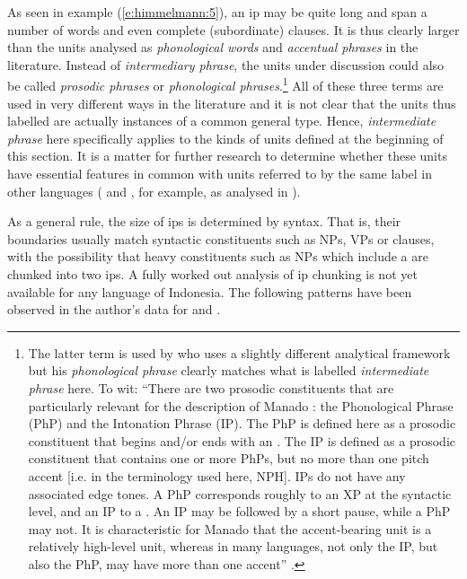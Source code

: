 \documentclass[output=paper
,modfonts
,nonflat]{langsci/langscibook}
\begin{document}
As seen in example (\ref{e:himmelmann:5}), an ip may be quite long and span a number of words and even complete (subordinate) clauses. It is thus clearly larger than the units analysed as \textit{phonological words} and \textit{accentual phrases} in the literature. Instead of \textit{intermediary phrase}, the units under discussion could also be called \textit{prosodic phrases} or \textit{phonological phrases}.\footnote{The latter term is used by \citet{Stoel2007} who uses a slightly different analytical framework but his \textit{phonological phrase} clearly matches what is labelled \textit{intermediate phrase} here. To wit: “There are two prosodic constituents that are particularly relevant for the description of Manado  : the Phonological Phrase (PhP) and the Intonation Phrase (IP). The PhP is defined here as a prosodic constituent that begins and/or ends with an . The IP is defined as a prosodic constituent that contains one or more PhPs, but no more than one pitch accent [i.e.  in the terminology used here, NPH]. IPs do not have any associated edge tones. A PhP corresponds roughly to an XP at the syntactic level, and an IP to a . An IP may be followed by a short pause, while a PhP may not. It is characteristic for Manado  that the accent-bearing unit is a relatively high-level unit, whereas in many  languages, not only the IP, but also the PhP, may have more than one accent” \citep[121]{Stoel2007}.} All of these three terms are used in very different ways in the literature and it is not clear that the units thus labelled are actually instances of a common general type. Hence, \textit{intermediate phrase} here specifically applies to the kinds of units defined at the beginning of this section. It is a matter for further research to determine whether these units have essential features in common with units referred to by the same label in other languages ( and , for example, as analysed in \citealt{Beckman1986}).

As a general rule, the size of ips is determined by syntax. That is, their boundaries usually match syntactic constituents such as NPs, VPs or clauses, with the possibility that heavy constituents such as NPs which include a  are chunked into two ips. A fully worked out analysis of ip chunking is not yet available for any  language of Indonesia. The following patterns have been observed in the author’s data for  and .
\end{document}
